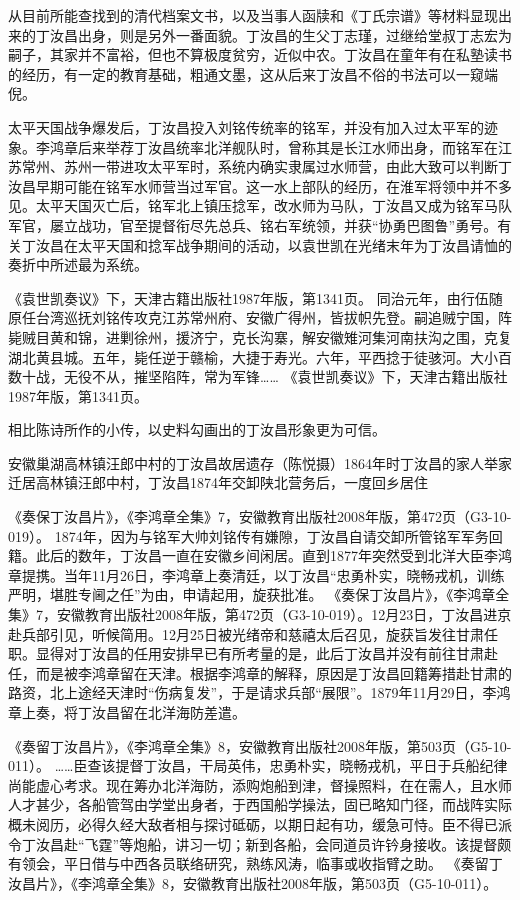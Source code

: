 \documentclass[12pt,UTF8]{ctexbook}
\begin{document}
从目前所能查找到的清代档案文书，以及当事人函牍和《丁氏宗谱》等材料显现出来的丁汝昌出身，则是另外一番面貌。丁汝昌的生父丁志瑾，过继给堂叔丁志宏为嗣子，其家并不富裕，但也不算极度贫穷，近似中农。丁汝昌在童年有在私塾读书的经历，有一定的教育基础，粗通文墨，这从后来丁汝昌不俗的书法可以一窥端倪。

太平天国战争爆发后，丁汝昌投入刘铭传统率的铭军，并没有加入过太平军的迹象。李鸿章后来举荐丁汝昌统率北洋舰队时，曾称其是长江水师出身，而铭军在江苏常州、苏州一带进攻太平军时，系统内确实隶属过水师营，由此大致可以判断丁汝昌早期可能在铭军水师营当过军官。这一水上部队的经历，在淮军将领中并不多见。太平天国灭亡后，铭军北上镇压捻军，改水师为马队，丁汝昌又成为铭军马队军官，屡立战功，官至提督衔尽先总兵、铭右军统领，并获“协勇巴图鲁”勇号。有关丁汝昌在太平天国和捻军战争期间的活动，以袁世凯在光绪末年为丁汝昌请恤的奏折中所述最为系统。

《袁世凯奏议》下，天津古籍出版社1987年版，第1341页。
同治元年，由行伍随原任台湾巡抚刘铭传攻克江苏常州府、安徽广得州，皆拔帜先登。嗣追贼宁国，阵毙贼目黄和锦，进剿徐州，援济宁，克长沟寨，解安徽雉河集河南扶沟之围，克复湖北黄县城。五年，毙任逆于赣榆，大捷于寿光。六年，平西捻于徒骇河。大小百数十战，无役不从，摧坚陷阵，常为军锋…… 《袁世凯奏议》下，天津古籍出版社1987年版，第1341页。

相比陈诗所作的小传，以史料勾画出的丁汝昌形象更为可信。


安徽巢湖高林镇汪郎中村的丁汝昌故居遗存（陈悦摄）1864年时丁汝昌的家人举家迁居高林镇汪郎中村，丁汝昌1874年交卸陕北营务后，一度回乡居住

《奏保丁汝昌片》，《李鸿章全集》7，安徽教育出版社2008年版，第472页（G3-10-019）。
1874年，因为与铭军大帅刘铭传有嫌隙，丁汝昌自请交卸所管铭军军务回籍。此后的数年，丁汝昌一直在安徽乡间闲居。直到1877年突然受到北洋大臣李鸿章提携。当年11月26日，李鸿章上奏清廷，以丁汝昌“忠勇朴实，晓畅戎机，训练严明，堪胜专阃之任”为由，申请起用，旋获批准。 《奏保丁汝昌片》，《李鸿章全集》7，安徽教育出版社2008年版，第472页（G3-10-019）。12月23日，丁汝昌进京赴兵部引见，听候简用。12月25日被光绪帝和慈禧太后召见，旋获旨发往甘肃任职。显得对丁汝昌的任用安排早已有所考量的是，此后丁汝昌并没有前往甘肃赴任，而是被李鸿章留在天津。根据李鸿章的解释，原因是丁汝昌回籍筹措赴甘肃的路资，北上途经天津时“伤病复发”，于是请求兵部“展限”。1879年11月29日，李鸿章上奏，将丁汝昌留在北洋海防差遣。

《奏留丁汝昌片》，《李鸿章全集》8，安徽教育出版社2008年版，第503页（G5-10-011）。
……臣查该提督丁汝昌，干局英伟，忠勇朴实，晓畅戎机，平日于兵船纪律尚能虚心考求。现在筹办北洋海防，添购炮船到津，督操照料，在在需人，且水师人才甚少，各船管驾由学堂出身者，于西国船学操法，固已略知门径，而战阵实际概未阅历，必得久经大敌者相与探讨砥砺，以期日起有功，缓急可恃。臣不得已派令丁汝昌赴“飞霆”等炮船，讲习一切；新到各船，会同道员许钤身接收。该提督颇有领会，平日借与中西各员联络研究，熟练风涛，临事或收指臂之助。 《奏留丁汝昌片》，《李鸿章全集》8，安徽教育出版社2008年版，第503页（G5-10-011）。
\end{document}

